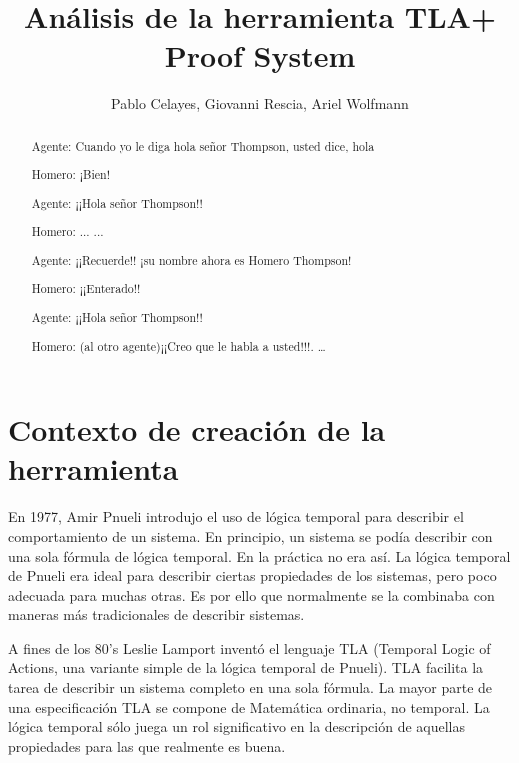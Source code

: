 \documentclass[spanish]{llncs}
\begin{document}
%

\mainmatter              %
%
\title{Análisis de la herramienta TLA+ Proof System}
%
%
\author{Pablo Celayes, Giovanni Rescia, Ariel Wolfmann}

%

\maketitle              %

\begin{abstract}
Agente: Cuando yo le diga hola señor Thompson, usted dice, hola

Homero: ¡Bien!

Agente: ¡¡Hola señor Thompson!!

Homero: ... ...

Agente: ¡¡Recuerde!! ¡su nombre ahora es Homero Thompson!

Homero: ¡¡Enterado!!

Agente: ¡¡Hola señor Thompson!!

Homero: (al otro agente)¡¡Creo que le habla a usted!!!. \dots

\end{abstract}
%

\section{Contexto de creación de la herramienta}

 En 1977, Amir Pnueli introdujo el uso de lógica temporal para describir el comportamiento de un sistema. En principio, un sistema se podía describir con una sola fórmula de lógica temporal. En la práctica no era así. La lógica temporal de Pnueli era ideal para describir ciertas propiedades de los sistemas, pero poco adecuada para muchas otras. Es por ello que normalmente se la combinaba con maneras más tradicionales de describir sistemas. \cite{pnueli}

A fines de los 80's Leslie Lamport inventó el lenguaje TLA (Temporal Logic of Actions, una variante simple de la lógica temporal de Pnueli). TLA facilita la tarea de describir un sistema completo en una sola fórmula. La mayor parte de una especificación TLA se compone de Matemática ordinaria, no temporal. La lógica temporal sólo juega un rol significativo en la descripción de aquellas propiedades para las que realmente es buena. \cite{specsys}
\end{document}

